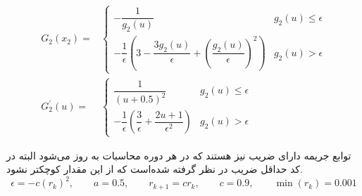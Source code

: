 \documentclass[12 pt]{article}
\begin{document}
\begin{align*}
	G_2(x_2) = &
	\begin{cases}
		-\dfrac{1}{g_2(u)}&  g_2(u) \leq \epsilon \\[1em]
		-\dfrac{1}{\epsilon}\left(3 - \dfrac{3g_2(u)}{\epsilon} + \left(\dfrac{g_2(u)}{\epsilon}\right)^2\right) &  g_2(u) > \epsilon
	\end{cases} \\
	G_2^\prime(u) = &
	\begin{cases}
		\dfrac{1}{(u + 0.5)^2}&  g_2(u) \leq \epsilon \\[1em]
		-\dfrac{1}{\epsilon}\left(\dfrac{3}{\epsilon} + \dfrac{2u+1}{\epsilon^2} \right) &  g_2(u) > \epsilon
	\end{cases} 
\end{align*}



توابع جریمه دارای ضریب نیز هستند که در هر دوره محاسبات به‌ روز می‌شود البته در کد حداقل ضریب   در نظر گرفته شده‌است که از این مقدار کوچکتر نشود.
$$
\epsilon = -c\left(r_k\right)^2,\qquad a = 0.5,\qquad r_{k+1} = cr_k,\qquad c = 0.9,
\qquad \min (r_k) = 0.001
$$
\end{document}
